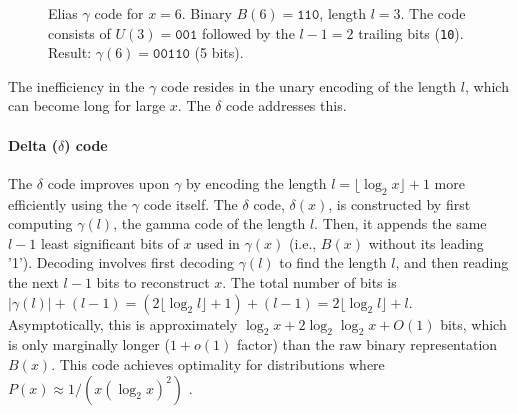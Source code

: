 \begin{figure}[hbtp]
    \centering
    \caption{Elias $\gamma$ code for $x=6$. Binary $B(6)=\texttt{110}$, length $l=3$. The code consists of $U(3)=\texttt{001}$ followed by the $l-1=2$ trailing bits (\texttt{10}). Result: $\gamma(6)=\texttt{00110}$ (5 bits).}
    \label{fig:gamma_code_example}
\end{figure}

\noindent The inefficiency in the $\gamma$ code resides in the unary encoding of the length $l$, which can become long for large $x$. The $\delta$ code addresses this.

\paragraph{Delta ($\delta$) code} The $\delta$ code improves upon $\gamma$ by encoding the length $l = \lfloor \log_2 x \rfloor + 1$ more efficiently using the $\gamma$ code itself. The $\delta$ code, $\delta(x)$, is constructed by first computing $\gamma(l)$, the gamma code of the length $l$. Then, it appends the same $l-1$ least significant bits of $x$ used in $\gamma(x)$ (i.e., $B(x)$ without its leading '1').
Decoding involves first decoding $\gamma(l)$ to find the length $l$, and then reading the next $l-1$ bits to reconstruct $x$. The total number of bits is $|\gamma(l)| + (l-1) = (2\lfloor \log_2 l \rfloor + 1) + (l-1) = 2\lfloor \log_2 l \rfloor + l$. Asymptotically, this is approximately $\log_2 x + 2\log_2 \log_2 x + O(1)$ bits, which is only marginally longer ($1+o(1)$ factor) than the raw binary representation $B(x)$. This code achieves optimality for distributions where $P(x) \approx 1/(x(\log_2 x)^2)$ \cite{ferragina2023pearls}.

